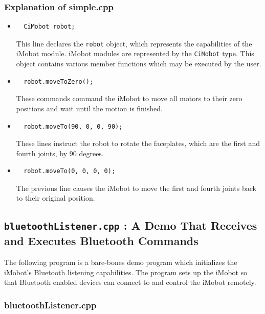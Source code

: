 \documentclass[11pt]{report}
\begin{document}
\subsubsection{Explanation of simple.cpp}
\begin{itemize}
\item 
\begin{verbatim}
  CiMobot robot;
\end{verbatim}
This line declares the \texttt{robot} object, which represents the
capabilities of the iMobot module. iMobot modules are represented by
the \texttt{CiMobot} type. This object contains various member
functions which may be executed by the user.
\item 
\begin{verbatim}
  robot.moveToZero();
\end{verbatim}
These commands command the iMobot to move all motors to their zero positions
and wait until the motion is finished.
\item 
\begin{verbatim}
  robot.moveTo(90, 0, 0, 90);
\end{verbatim}
These lines instruct the robot to rotate the faceplates, which are the first
and fourth joints, by 90 degrees. 
\item 
\begin{verbatim}
  robot.moveTo(0, 0, 0, 0);
\end{verbatim}
The previous line causes the iMobot to move the first and fourth joints back to
their original position.
\end{itemize}

\subsection{\texttt{bluetoothListener.cpp} : A Demo That Receives and Executes
Bluetooth Commands}
The following program is a bare-bones demo program which initializes the iMobot's
Bluetooth listening capabilities. The program sets up the iMobot so that Bluetooth
enabled devices can connect to and control the iMobot remotely. 
\subsubsection{bluetoothListener.cpp}
\end{document}
